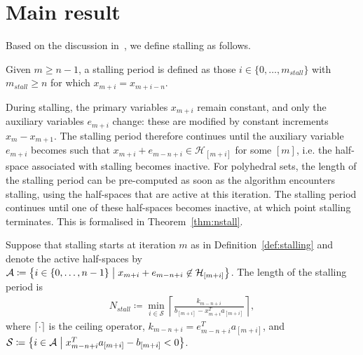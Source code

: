 \section{Main result}
\label{sec:main_result}

Based on the discussion in~\cite{DYKSTRASTALLING}, we define stalling as follows.

\begin{defn}[Stalling]\label{def:stalling}
Given $m\geq n-1$, a stalling period is defined as those $i\in\lbrace 0,\dots,m_{stall}\rbrace$ with $m_{stall}\geq n$ for which $x_{m+i}=x_{m+i-n}$.
\end{defn}

During stalling, the primary variables $x_{m+i}$ remain constant, and only the auxiliary variables $e_{m+i}$ change: these are modified by constant increments $x_m-x_{m+1}$. The stalling period therefore continues until the auxiliary variable $e_{m+i}$ becomes such that $x_{m+i}+e_{m-n+i}\in\mathcal{H}_{[m+i]}$ for some $[m]$, i.e. the half-space associated with stalling becomes inactive. For polyhedral sets, the length of the stalling period can be pre-computed as soon as the algorithm encounters stalling, using the half-spaces that are active at this iteration. The stalling period continues until one of these half-spaces becomes inactive, at which point stalling terminates. This is formalised in Theorem~\ref{thm:nstall}.

\begin{thm}\label{thm:nstall}
Suppose that stalling starts at iteration $m$ as in Definition~\ref{def:stalling} and denote the active half-spaces by $\mathcal{A}\coloneqq\left\{ i\in\lbrace 0,\dots,n-1\rbrace \;\middle|\; x_{m+i}+e_{m-n+i}\not\in\mathcal{H}_{[m+i]} \right\}$. The length of the stalling period is
\begin{align}\label{eq:nstall}
N_{stall}\coloneqq\min_{i\in\mathcal{S}} \left\lceil \frac{k_{m-n+i}}{b_{[m+i]}-x_{m+i}^T a_{[m+i]}}\right\rceil,
\end{align}
where $\lceil\cdot\rceil$ is the ceiling operator, $k_{m-n+i}=e_{m-n+i}^T a_{[m+i]}$, and $\mathcal{S}\coloneqq\left\{ i\in \mathcal{A} \;\middle|\; x_{m-n+i}^T a_{[m+i]} - b_{[m+i]} < 0 \right\}$.
\end{thm}

